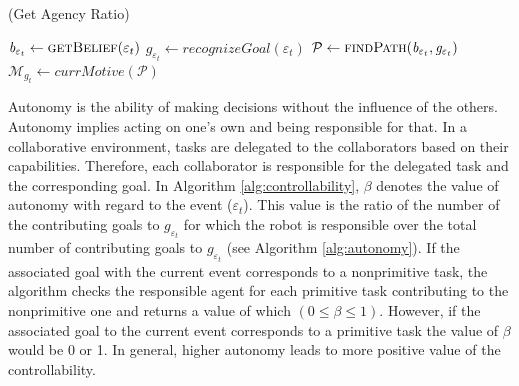 \documentclass[letterpaper]{article}
\begin{document}
\begin{algorithm}
	\caption{(Get Agency Ratio)}
	\label{alg:agency}
	\begin{algorithmic}[1]
			\Statex
			\State $\mathit{b}_{\varepsilon_t} \gets \Call{getBelief}{\varepsilon_t}$
			\State $\mathit{g}_{\varepsilon_t} \gets
			\textit{recognizeGoal}{(\varepsilon_t)}$
			\Statex
				\State {}
			\EndIf
			\Statex
			\State $\mathcal{P} \gets \Call{findPath}{\mathit{b}_{\varepsilon_t},
			\mathit{g}_{\varepsilon_t}}$
			\Statex
				\State
				\State $\mathcal{M}_{\mathit{g}_{t}} \gets
				\textit{currMotive}{(\mathcal{P})}$
				\Statex
					 \State {}
					\Else
						\State {}
					\EndIf
				\Else
					\State {}
				\EndIf
			\Else
				\State {}
			\EndIf
		\EndFunction 
	\end{algorithmic}
\end{algorithm}

Autonomy is the ability of making decisions without the influence of the others.
Autonomy implies acting on one's own and being responsible for that. In a
collaborative environment, tasks are delegated to the collaborators based on
their capabilities. Therefore, each collaborator is responsible for the
delegated task and the corresponding goal. In Algorithm
\ref{alg:controllability}, $\beta$ denotes the value of autonomy with regard to
the event ($\varepsilon_t$). This value is the ratio of the number of the
contributing goals to $\mathit{g}_{\varepsilon_t}$ for which the robot is
responsible over the total number of contributing goals to
$\mathit{g}_{\varepsilon_t}$ (see Algorithm \ref{alg:autonomy}). If the
associated goal with the current event corresponds to a nonprimitive task, the
algorithm checks the responsible agent for each primitive task contributing to
the nonprimitive one and returns a value of which $(0 \leq \beta \leq 1)$.
However, if the associated goal to the current event corresponds to a primitive
task the value of $\beta$ would be 0 or 1. In general, higher autonomy leads to
more positive value of the controllability.
\end{document}
